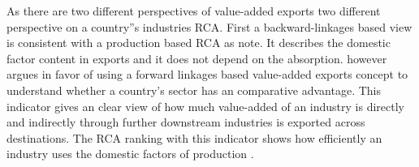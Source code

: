 As there are two different perspectives of value-added exports  two different perspective on a country''s industries RCA.  First a backward-linkages based view is consistent with a production based RCA as \textcite{Koopman} note. It describes the domestic factor content in exports and it does not depend on the absorption.
 \textcite{wang2013} however argues in favor of using a forward linkages based value-added exports concept to understand whether a country's sector has an comparative advantage. This indicator gives an clear view of how much value-added of an industry is directly  and indirectly through further downstream industries
is exported across destinations.  The RCA ranking with this indicator shows how efficiently an industry uses the domestic factors of production  \textcite{bladwin}. %
